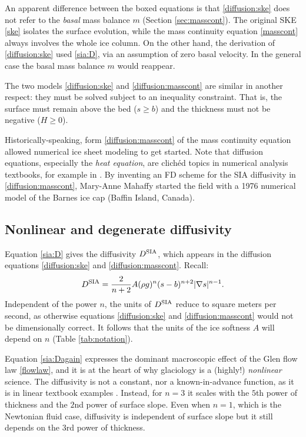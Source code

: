 \documentclass[letterpaper,final,12pt,reqno]{amsart}
\newcommand{\grad}{\nabla}
\newcommand{\Dsia}{D^{\text{\textrm{SIA}}}}
\begin{document}
An apparent difference between the boxed equations is that \eqref{diffusion:ske} does not refer to the \emph{basal} mass balance $m$ (Section \ref{sec:masscont}).  The original SKE \eqref{ske} isolates the surface evolution, while the mass continuity equation \eqref{masscont} always involves the whole ice column.  On the other hand, the derivation of \eqref{diffusion:ske} used \eqref{sia:D}, via an assumption of zero basal velocity.  In the general case the basal mass balance $m$ would reappear.

The two models \eqref{diffusion:ske} and \eqref{diffusion:masscont} are similar in another respect: they must be solved subject to an inequality constraint.  That is, the surface must remain above the bed ($s\ge b$) and the thickness must not be negative ($H\ge 0$).

Historically-speaking, form \eqref{diffusion:masscont} of the mass continuity equation allowed numerical ice sheet modeling to get started.  Note that diffusion equations, especially the \emph{heat equation}, are clich\'ed topics in numerical analysis textbooks, for example in \cite{LeVeque2007,MortonMayers2005}.  By inventing an FD scheme for the SIA diffusivity in \eqref{diffusion:masscont}, Mary-Anne Mahaffy \cite{Mahaffy1976} started the field with a 1976 numerical model of the Barnes ice cap (Baffin Island, Canada).

\subsection*{Nonlinear and degenerate diffusivity}  Equation \eqref{sia:D} gives the diffusivity $\Dsia$, which appears in the diffusion equations \eqref{diffusion:ske} and \eqref{diffusion:masscont}.  Recall:
\begin{equation}
\Dsia = \frac{2}{n+2} A (\rho g)^n (s-b)^{n+2} |\grad s|^{n-1}. \label{sia:Dagain}
\end{equation}
Independent of the power $n$, the units of $\Dsia$ reduce to square meters per second, as otherwise equations \eqref{diffusion:ske} and \eqref{diffusion:masscont} would not be dimensionally correct.  It follows that the units of the ice softness $A$ will depend on $n$ (Table \ref{tab:notation}).

Equation \eqref{sia:Dagain} expresses the dominant macroscopic effect of the Glen flow law \eqref{flowlaw}, and it is at the heart of why glaciology is a (highly!) \emph{nonlinear} science.  The diffusivity is not a constant, nor a known-in-advance function, as it is in linear textbook examples \cite{LeVeque2007,MortonMayers2005}.  Instead, for $n=3$ it scales with the $5$th power of thickness and the $2$nd power of surface slope.  Even when $n=1$, which is the Newtonian fluid case, diffusivity is independent of surface slope but it still depends on the $3$rd power of thickness.
\end{document}
